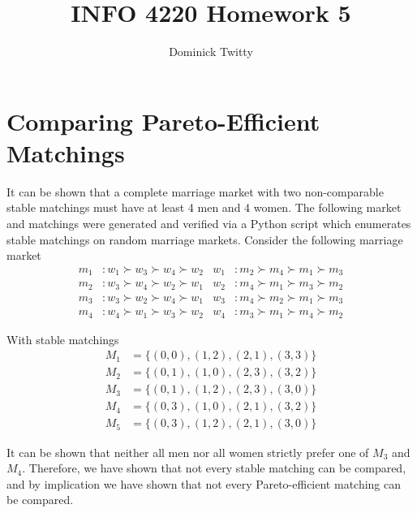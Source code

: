 \documentclass[12pt]{article}
\begin{document}
\title{INFO 4220 Homework 5}
\author{Dominick Twitty}
\date{}
\maketitle

\section{Comparing Pareto-Efficient Matchings}
It can be shown that a complete marriage market with two non-comparable stable matchings must have at least 4 men and 4 women. The following market and matchings were generated and verified via a Python script which enumerates stable matchings on random marriage markets. Consider the following marriage market
\begin{align*}
m_1 &: w_1 \succ w_3 \succ w_4 \succ w_2 & w_1 &: m_2 \succ m_4 \succ m_1 \succ m_3\\
m_2 &: w_3 \succ w_4 \succ w_2 \succ w_1 & w_2 &: m_4 \succ m_1 \succ m_3 \succ m_2\\
m_3 &: w_3 \succ w_2 \succ w_4 \succ w_1 & w_3 &: m_4 \succ m_2 \succ m_1 \succ m_3\\
m_4 &: w_4 \succ w_1 \succ w_3 \succ w_2 & w_4 &: m_3 \succ m_1 \succ m_4 \succ m_2
\end{align*}

\noindent With stable matchings
\begin{align*}
M_1 &= \{(0, 0), (1, 2), (2, 1), (3, 3)\}\\
M_2 &= \{(0, 1), (1, 0), (2, 3), (3, 2)\}\\
M_3 &= \{(0, 1), (1, 2), (2, 3), (3, 0)\}\\
M_4 &= \{(0, 3), (1, 0), (2, 1), (3, 2)\}\\
M_5 &= \{(0, 3), (1, 2), (2, 1), (3, 0)\}
\end{align*}

It can be shown that neither all men nor all women strictly prefer one of $M_3$ and $M_4$. Therefore, we have shown that not every stable matching can be compared, and by implication we have shown that not every Pareto-efficient matching can be compared.
\end{document}

